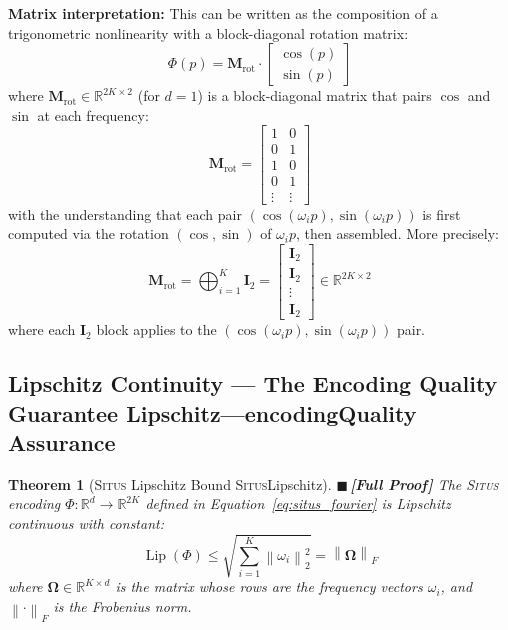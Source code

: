\documentclass[12pt,a4paper]{article}
\newtheorem{theorem}{Theorem}[section]
\theoremstyle{definition}
\newcommand{\rigorFull}{{\color{rigorcolor}$\blacksquare$\,\textbf{[Full Proof]}}}
\newcommand{\Situs}{\textsc{Situs}}
\DeclareMathOperator{\Lip}{Lip}
\newcommand{\R}{\mathbb{R}}
\newcommand{\norm}[1]{\left\lVert#1\right\rVert}
\newcommand{\mat}[1]{\mathbf{#1}}
\begin{document}
\textbf{Matrix interpretation:} This can be written as the composition of a trigonometric
nonlinearity with a block-diagonal rotation matrix:
\begin{equation}\label{eq:situs_rotation}
    \boxed{\Phi(p) = \mat{M}_{\text{rot}} \cdot \begin{bmatrix} \cos(p) \\ \sin(p) \end{bmatrix}}
\end{equation}
where $\mat{M}_{\text{rot}} \in \R^{2K \times 2}$ (for $d=1$) is a block-diagonal matrix
that pairs $\cos$ and $\sin$ at each frequency:
\[
\mat{M}_{\text{rot}} = \begin{bmatrix}
    1 & 0 \\
    0 & 1 \\
    1 & 0 \\
    0 & 1 \\
    \vdots & \vdots
\end{bmatrix}
\]
with the understanding that each pair $(\cos(\omega_i p), \sin(\omega_i p))$ is first 
computed via the rotation $(\cos, \sin)$ of $\omega_i p$, then assembled. More precisely:
\begin{equation}\label{eq:situs_block_diag}
    \mat{M}_{\text{rot}} = \bigoplus_{i=1}^{K} \mat{I}_2 = \begin{bmatrix}
        \mat{I}_2 \\ \mat{I}_2 \\ \vdots \\ \mat{I}_2
    \end{bmatrix} \in \R^{2K \times 2}
\end{equation}
where each $\mat{I}_2$ block applies to the $(\cos(\omega_i p), \sin(\omega_i p))$ pair.

\subsection{Lipschitz Continuity — The Encoding Quality Guarantee Lipschitz---encodingQuality Assurance}

\begin{theorem}[\Situs{} Lipschitz Bound \Situs{}Lipschitz]\label{thm:situs_lipschitz}
\rigorFull
The \Situs{} encoding $\Phi: \R^d \to \R^{2K}$ defined in Equation~\ref{eq:situs_fourier} 
is Lipschitz continuous with constant:
\begin{equation}\label{eq:situs_lipschitz_constant}
    \Lip(\Phi) \leq \sqrt{\sum_{i=1}^{K} \norm{\omega_i}_2^2} = \norm{\boldsymbol{\Omega}}_F
\end{equation}
where $\boldsymbol{\Omega} \in \R^{K \times d}$ is the matrix whose rows are the 
frequency vectors $\omega_i$, and $\norm{\cdot}_F$ is the Frobenius norm.
\end{theorem}
\end{document}
